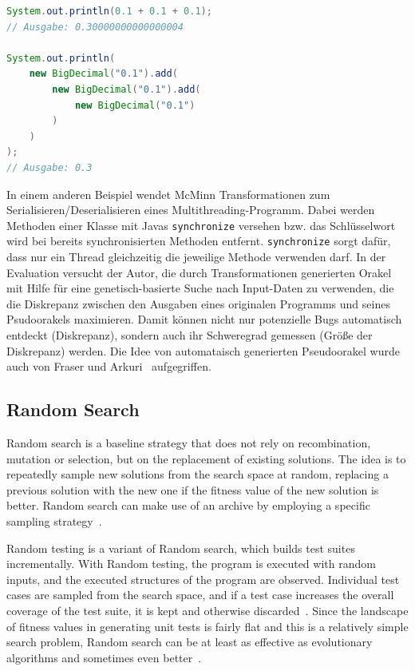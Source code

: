 \documentclass{article}
\begin{document}
\begin{lstlisting}[language=Java, style=boxed, caption={Comparing floating-point arithmetic in Java using double compared to \lstinline{BigDecimal}~\cite{McMinn2009}}, label=lst:java-transformations]
System.out.println(0.1 + 0.1 + 0.1);
// Ausgabe: 0.30000000000000004

System.out.println(
    new BigDecimal("0.1").add(
        new BigDecimal("0.1").add(
            new BigDecimal("0.1")
        )
    )
);
// Ausgabe: 0.3
\end{lstlisting}

In einem anderen Beispiel wendet McMinn Transformationen zum Serialisieren/Deserialisieren eines Multithreading-Programm. Dabei werden Methoden einer Klasse mit Javas \lstinline{synchronize} versehen bzw. das Schlüsselwort wird bei bereits synchronisierten Methoden entfernt. \lstinline{synchronize} sorgt dafür, dass nur ein Thread gleichzeitig die jeweilige Methode verwenden darf. In der Evaluation versucht der Autor, die durch Transformationen generierten Orakel mit Hilfe für eine genetisch-basierte Suche nach Input-Daten zu verwenden, die die Diskrepanz zwischen den Ausgaben eines originalen Programms und seines Psudoorakels maximieren. Damit können nicht nur potenzielle Bugs automatisch entdeckt (Diskrepanz), sondern auch ihr Schweregrad gemessen (Größe der Diskrepanz) werden. Die Idee von automataisch generierten Pseudoorakel wurde auch von Fraser und Arkuri~\cite{Fraser_2013} aufgegriffen. 

\subsection{Random Search}
Random search is a baseline strategy that does not rely on recombination, mutation or selection, but on the replacement of existing solutions. The idea is to repeatedly sample new solutions from the search space at random, replacing a previous solution with the new one if the fitness value of the new solution is better. Random search can make use of an archive by employing a specific sampling strategy~\cite{Campos2017}.

Random testing is a variant of Random search, which builds test suites incrementally. With Random testing, the program is executed with random inputs, and the executed structures of the program are observed. Individual test cases are sampled from the search space, and if a test case increases the overall coverage of the test suite, it is kept and otherwise discarded~\cite{Campos2017}. Since the landscape of fitness values in generating unit tests is fairly flat and this is a relatively simple search problem, Random search can be at least as effective as evolutionary algorithms and sometimes even better~\cite{Shamshiri2015a}.
\end{document}
